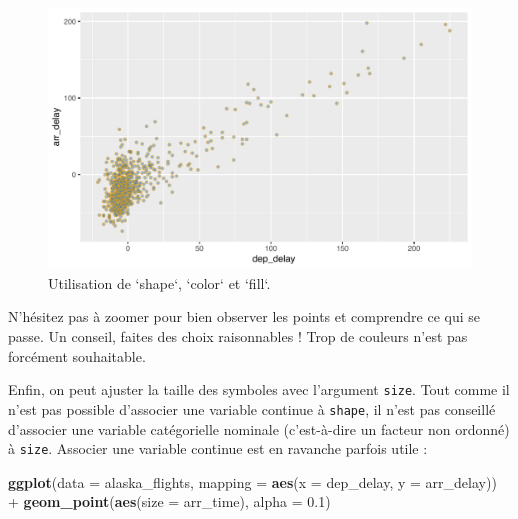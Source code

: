 \documentclass[a4paperpaper,]{article}
\newenvironment{Shaded}{\begin{snugshade}}{\end{snugshade}}
\newcommand{\DataTypeTok}[1]{\textcolor[rgb]{0.00,0.34,0.68}{#1}}
\newcommand{\FloatTok}[1]{\textcolor[rgb]{0.69,0.50,0.00}{#1}}
\newcommand{\KeywordTok}[1]{\textcolor[rgb]{0.12,0.11,0.11}{\textbf{#1}}}
\newcommand{\NormalTok}[1]{\textcolor[rgb]{0.12,0.11,0.11}{#1}}
\newcommand{\OperatorTok}[1]{\textcolor[rgb]{0.12,0.11,0.11}{#1}}
\newcommand{\StringTok}[1]{\textcolor[rgb]{0.75,0.01,0.01}{#1}}
\begin{document}
\begin{figure}[htpb]

{\centering \includegraphics[width=0.9\linewidth]{figure/shapecolorplot-1} 

}

\caption{Utilisation de `shape`, `color` et `fill`.}\label{fig:shapecolorplot}
\end{figure}

N'hésitez pas à zoomer pour bien observer les points et comprendre ce qui se passe. Un conseil, faites des choix raisonnables ! Trop de couleurs n'est pas forcément souhaitable.

Enfin, on peut ajuster la taille des symboles avec l'argument \texttt{size}. Tout comme il n'est pas possible d'associer une variable continue à \texttt{shape}, il n'est pas conseillé d'associer une variable catégorielle nominale (c'est-à-dire un facteur non ordonné) à \texttt{size}. Associer une variable continue est en ravanche parfois utile :

\begin{Shaded}
\begin{Highlighting}[]
\KeywordTok{ggplot}\NormalTok{(}\DataTypeTok{data =}\NormalTok{ alaska_flights, }\DataTypeTok{mapping =} \KeywordTok{aes}\NormalTok{(}\DataTypeTok{x =}\NormalTok{ dep_delay, }\DataTypeTok{y =}\NormalTok{ arr_delay)) }\OperatorTok{+}
\StringTok{  }\KeywordTok{geom_point}\NormalTok{(}\KeywordTok{aes}\NormalTok{(}\DataTypeTok{size =}\NormalTok{ arr_time), }\DataTypeTok{alpha =} \FloatTok{0.1}\NormalTok{)}
\end{Highlighting}
\end{Shaded}
\end{document}
